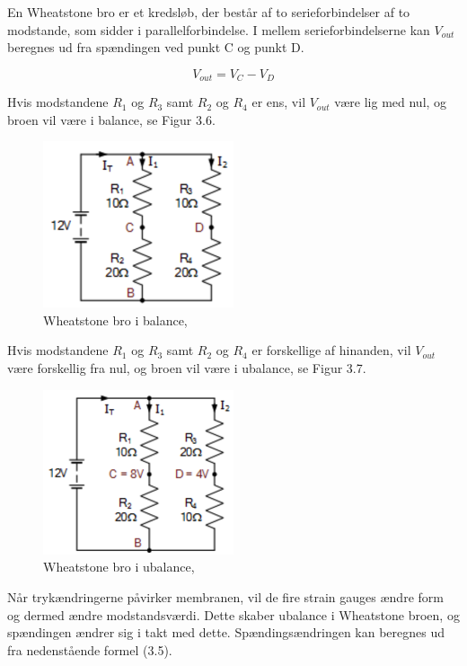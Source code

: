 En Wheatstone bro er et kredsløb, der består af to serieforbindelser af to modstande, som sidder i parallelforbindelse. I mellem serieforbindelserne kan $V_{out}$ beregnes ud fra spændingen ved punkt C og punkt D.

\begin{equation}
	V_{out} = V_{C} - V_{D}
\end{equation} 

Hvis modstandene $R_{1}$ og $R_{3}$ samt $R_{2}$ og $R_{4}$ er ens, vil $V_{out}$ være lig med nul, og broen vil være i balance, se Figur 3.6. 

\begin{figure}[H]
	\centering
	\includegraphics[width=0.5\textwidth]{Figurer/Snip20151207_64}
	\caption{Wheatstone bro i balance, \protect\cite{Wheatestone}}
\end{figure}

Hvis modstandene $R_{1}$ og $R_{3}$ samt $R_{2}$ og $R_{4}$ er forskellige af hinanden, vil $V_{out}$ være forskellig fra nul, og broen vil være i ubalance, se Figur 3.7. 

\begin{figure}[H]
	\centering
	\includegraphics[width=0.5\textwidth]{Figurer/Snip20151207_65}
	\caption{Wheatstone bro i ubalance, \protect\cite{Wheatestone}}
\end{figure}

Når trykændringerne påvirker membranen, vil de fire strain gauges ændre form og dermed ændre modstandsværdi. Dette skaber ubalance i Wheatstone broen, og spændingen ændrer sig i takt med dette. Spændingsændringen kan beregnes ud fra nedenstående formel (3.5).


